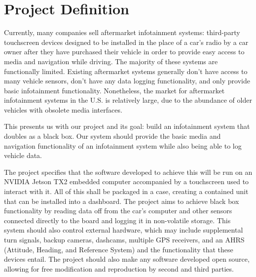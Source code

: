 \documentclass[onecolumn, draftclsnofoot,10pt, compsoc]{IEEEtran}
\begin{document}
\newpage
{}
\tableofcontents
\clearpage

\section{Project Definition}
Currently, many companies sell aftermarket infotainment systems: third-party touchscreen devices designed to be installed in the place of a car's radio by a car owner after they have purchased their vehicle in order to provide easy access to media and navigation while driving. The majority of these systems are functionally limited. Existing aftermarket systems generally don't have access to many vehicle sensors, don't have any data logging functionality, and only provide basic infotainment functionality. Nonetheless, the market for aftermarket infotainment systems in the U.S. is relatively large, due to the abundance of older vehicles with obsolete media interfaces.\par

This presents us with our project and its goal: build an infotainment system that doubles as a black box. Our system should provide the basic media and navigation functionality of an infotainment system while also being able to log vehicle data.\par

The project specifies that the software developed to achieve this will be run on an NVIDIA Jetson TX2 embedded computer accompanied by a touchscreen used to interact with it. All of this shall be packaged in a case, creating a contained unit that can be installed into a dashboard. The project aims to achieve black box functionality by reading data off from the car's computer and other sensors connected directly to the board and logging it in non-volatile storage. This system should also control external hardware, which may include supplemental turn signals, backup cameras, dashcams, multiple GPS receivers, and an AHRS (Attitude, Heading, and Reference System) and the functionality that these devices entail. The project should also make any software developed open source, allowing for free modification and reproduction by second and third parties.\par
\end{document}
